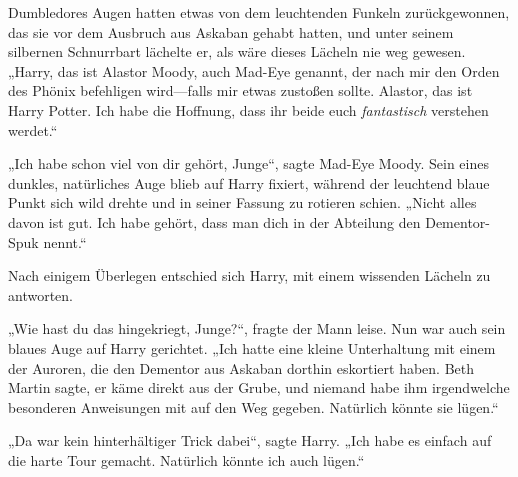 Dumbledores Augen hatten etwas von dem leuchtenden Funkeln zurückgewonnen, das sie vor dem Ausbruch aus Askaban gehabt hatten, und unter seinem silbernen Schnurrbart lächelte er, als wäre dieses Lächeln nie weg gewesen. „Harry, das ist Alastor Moody, auch Mad-Eye genannt, der nach mir den Orden des Phönix befehligen wird—falls mir etwas zustoßen sollte. Alastor, das ist Harry Potter. Ich habe die Hoffnung, dass ihr beide euch \emph{fantastisch} verstehen werdet.“

„Ich habe schon viel von dir gehört, Junge“, sagte Mad-Eye Moody. Sein eines dunkles, natürliches Auge blieb auf Harry fixiert, während der leuchtend blaue Punkt sich wild drehte und in seiner Fassung zu rotieren schien. „Nicht alles davon ist gut. Ich habe gehört, dass man dich in der Abteilung den Dementor-Spuk nennt.“

Nach einigem Überlegen entschied sich Harry, mit einem wissenden Lächeln zu antworten.

„Wie hast du das hingekriegt, Junge?“, fragte der Mann leise. Nun war auch sein blaues Auge auf Harry gerichtet. „Ich hatte eine kleine Unterhaltung mit einem der Auroren, die den Dementor aus Askaban dorthin eskortiert haben. Beth Martin sagte, er käme direkt aus der Grube, und niemand habe ihm irgendwelche besonderen Anweisungen mit auf den Weg gegeben. Natürlich könnte sie lügen.“

„Da war kein hinterhältiger Trick dabei“, sagte Harry. „Ich habe es einfach auf die harte Tour gemacht. Natürlich könnte ich auch lügen.“

